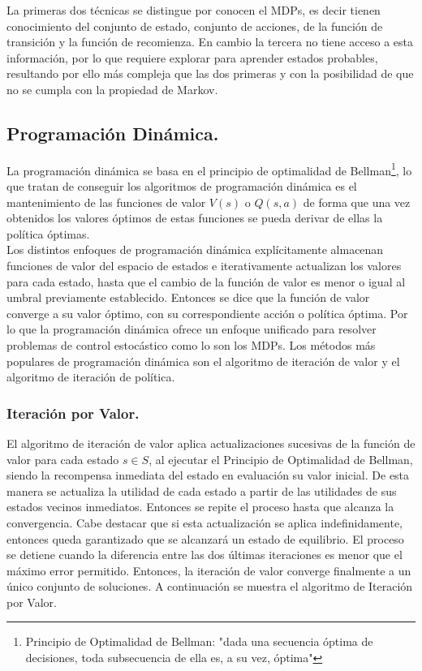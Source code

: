 La primeras dos técnicas se distingue por conocen el MDPs, es decir tienen conocimiento del conjunto de estado, conjunto de acciones, de la función de transición y la función de recomienza. En cambio la tercera no tiene acceso a esta información, por lo que requiere explorar para aprender estados probables, resultando por ello más compleja que las dos primeras y con la posibilidad de que no se cumpla con la propiedad de Markov.

\subsection{Programación Dinámica.}
La programación dinámica se basa en el principio de optimalidad de Bellman\footnote{Principio de Optimalidad de Bellman: "dada una secuencia óptima de decisiones, toda subsecuencia de ella es, a su vez, óptima"}, lo que tratan de conseguir los algoritmos de programación dinámica es el mantenimiento de las funciones de valor $V (s)$ o $Q(s, a)$ de forma que una vez obtenidos los valores óptimos de estas funciones se pueda derivar de ellas la política óptimas.\\

Los distintos enfoques de programación dinámica explícitamente almacenan funciones de valor del espacio de estados e iterativamente actualizan los valores para cada estado, hasta que el cambio de la función de valor es menor o igual al umbral previamente establecido. Entonces se dice que la función de valor converge a su valor óptimo, con su correspondiente acción o política óptima. Por lo que la programación dinámica ofrece un enfoque unificado para resolver problemas de control estocástico como lo son los MDPs. Los métodos más populares de programación dinámica son el algoritmo de iteración de valor y el algoritmo de iteración de política.

\subsubsection{Iteración por Valor.}
El algoritmo de iteración de valor aplica actualizaciones sucesivas de la función de valor para cada estado $s \in S$, al ejecutar el Principio de Optimalidad de Bellman, siendo la recompensa inmediata del estado en evaluación su valor inicial. De esta manera se actualiza la utilidad de cada estado a partir de las utilidades de sus estados vecinos inmediatos. Entonces se repite el proceso hasta que alcanza la convergencia. Cabe destacar que si esta actualización se aplica indefinidamente, entonces queda garantizado que se alcanzará un estado de equilibrio. El proceso se detiene cuando la diferencia entre las dos últimas iteraciones es menor que el máximo error permitido. Entonces, la iteración de valor converge finalmente a un único conjunto de soluciones. A continuación se muestra el algoritmo de Iteración por Valor.

